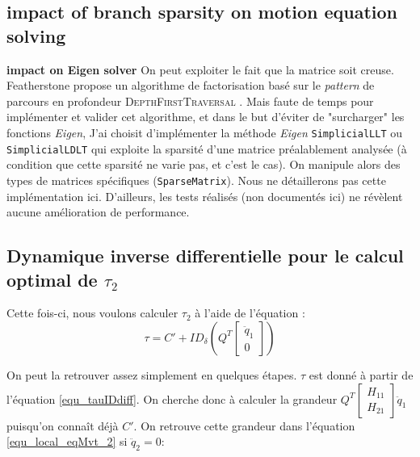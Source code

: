 \documentclass{report}
\begin{document}
\subsection{impact of branch sparsity on motion equation solving}
\textbf{impact on Eigen solver}
On peut exploiter le fait que la matrice soit creuse. Featherstone propose un algorithme de factorisation basé sur le \emph{pattern} de parcours en profondeur \textsc{DepthFirstTraversal} \cite[table 6.3 p112]{bib_featherstone}. Mais faute de temps pour implémenter et valider cet algorithme, et dans le but d'éviter de "surcharger" les fonctions \emph{Eigen}, J'ai choisit d'implémenter la méthode \emph{Eigen} \verb;SimplicialLLT; ou \verb;SimplicialLDLT; qui exploite la sparsité d'une matrice préalablement analysée (à condition que cette sparsité ne varie pas, et c'est le cas). On manipule alors des types de matrices spécifiques (\verb;SparseMatrix;). Nous ne détaillerons pas cette implémentation ici. D'ailleurs, les tests réalisés (non documentés ici) ne révèlent aucune amélioration de performance.


\subsection{Dynamique inverse differentielle pour le calcul optimal de $\tau_2$}

Cette fois-ci, nous voulons calculer $\tau_2$ à l'aide de l'équation \cite[p104,173]{bib_featherstone}:
\begin{equation}
\tau = C' + ID_{\delta} \left( Q^T \begin{bmatrix} 
                                     \ddot{q}_1 \\
                                     0 
                                   \end{bmatrix} \right) \label{equ_tauIDdiff_2}
\end{equation}

On peut la retrouver assez simplement en quelques étapes. $\tau$ est donné à partir de l'équation \ref{equ_tauIDdiff}. On cherche donc à calculer la grandeur $Q^T \begin{bmatrix}
                            H_{11} \\
                            H_{21}
                          \end{bmatrix} \ddot{q}_1$ puisqu'on connaît déjà $C'$. On retrouve cette grandeur dans l'équation \ref{equ_local_eqMvt_2} si $\ddot{q}_2 = 0$:
\end{document}
